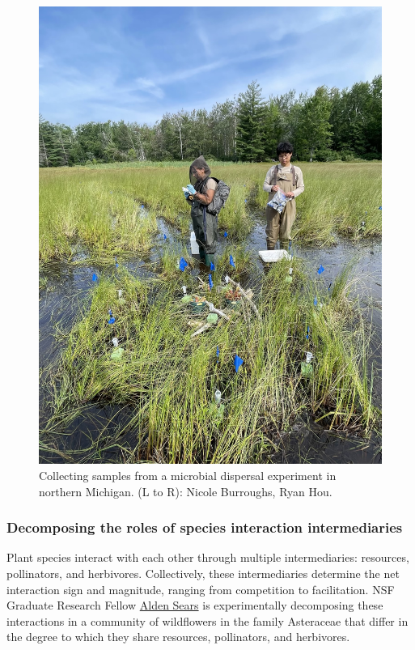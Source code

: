 \documentclass[
  letterpaper,
  DIV=11,
  numbers=noendperiod]{scrartcl}
\begin{document}
\begin{figure}[H]

{\centering \includegraphics[width=4.5in,height=\textheight,keepaspectratio]{../static/protist-dispersal-array.jpg}

}

\caption{Collecting samples from a microbial dispersal experiment in
northern Michigan. (L to R): Nicole Burroughs, Ryan Hou.}

\end{figure}%

\subsubsection{Decomposing the roles of species interaction
intermediaries}\label{decomposing-the-roles-of-species-interaction-intermediaries}

Plant species interact with each other through multiple intermediaries:
resources, pollinators, and herbivores. Collectively, these
intermediaries determine the net interaction sign and magnitude, ranging
from competition to facilitation. NSF Graduate Research Fellow
\href{../people/sears-a/about.qmd}{Alden Sears} is experimentally
decomposing these interactions in a community of wildflowers in the
family Asteraceae that differ in the degree to which they share
resources, pollinators, and herbivores.
\end{document}
